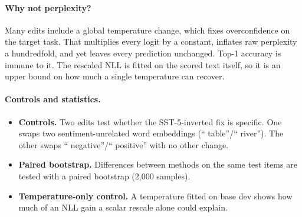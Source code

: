 \paragraph{Why not perplexity?} Many edits include a global temperature change, which fixes overconfidence on the target task. That multiplies every logit by a constant, inflates raw perplexity a hundredfold, and yet leaves every prediction unchanged. Top-1 accuracy is immune to it. The rescaled NLL is fitted on the scored text itself, so it is an upper bound on how much a single temperature can recover.

\paragraph{Controls and statistics.}
\begin{itemize}
  \item \textbf{Controls.} Two edits test whether the SST-5-inverted fix is specific. One swaps two sentiment-unrelated word embeddings (`` table''/`` river''). The other swaps `` negative''/`` positive'' with no other change.
  \item \textbf{Paired bootstrap.} Differences between methods on the same test items are tested with a paired bootstrap (2,000 samples).
  \item \textbf{Temperature-only control.} A temperature fitted on base dev shows how much of an NLL gain a scalar rescale alone could explain.
\end{itemize}
